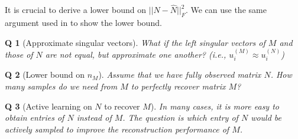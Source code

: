 \documentclass{article} %
\newtheorem{question}{Q}
\begin{document}
It is crucial to derive a lower bound on $||N-\hat{N}||_F^2$. We can use the same argument used in \cite{lafond2015low} to show the lower bound.


\begin{question}[Approximate singular vectors]
What if the left singular vectors of $M$ and those of $N$ are not equal, but approximate one another? (i.e., $u_i^{(M)} \approx u_i^{(N)}$)
\end{question}

\begin{question}[Lower bound on $n_M$]
Assume that we have fully observed matrix $N$. How many samples do we need from $M$ to perfectly recover matrix $M$?
\end{question}

\begin{question}[Active learning on $N$ to recover $M$]
In many cases, it is more easy to obtain entries of $N$ instead of $M$. The question is which entry of $N$ would be actively sampled to improve the reconstruction performance of $M$.
\end{question}





\end{document}
